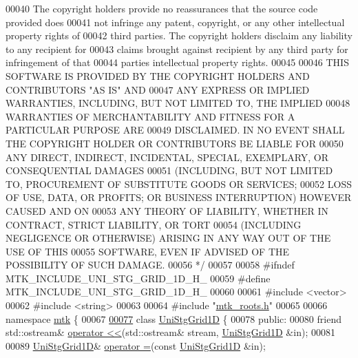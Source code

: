 \begin{DoxyCode}
00040 \textcolor{comment}{The copyright holders provide no reassurances that the source code provided does}
00041 \textcolor{comment}{not infringe any patent, copyright, or any other intellectual property rights of}
00042 \textcolor{comment}{third parties. The copyright holders disclaim any liability to any recipient for}
00043 \textcolor{comment}{claims brought against recipient by any third party for infringement of that}
00044 \textcolor{comment}{parties intellectual property rights.}
00045 \textcolor{comment}{}
00046 \textcolor{comment}{THIS SOFTWARE IS PROVIDED BY THE COPYRIGHT HOLDERS AND CONTRIBUTORS "AS IS" AND}
00047 \textcolor{comment}{ANY EXPRESS OR IMPLIED WARRANTIES, INCLUDING, BUT NOT LIMITED TO, THE IMPLIED}
00048 \textcolor{comment}{WARRANTIES OF MERCHANTABILITY AND FITNESS FOR A PARTICULAR PURPOSE ARE}
00049 \textcolor{comment}{DISCLAIMED. IN NO EVENT SHALL THE COPYRIGHT HOLDER OR CONTRIBUTORS BE LIABLE FOR}
00050 \textcolor{comment}{ANY DIRECT, INDIRECT, INCIDENTAL, SPECIAL, EXEMPLARY, OR CONSEQUENTIAL DAMAGES}
00051 \textcolor{comment}{(INCLUDING, BUT NOT LIMITED TO, PROCUREMENT OF SUBSTITUTE GOODS OR SERVICES;}
00052 \textcolor{comment}{LOSS OF USE, DATA, OR PROFITS; OR BUSINESS INTERRUPTION) HOWEVER CAUSED AND ON}
00053 \textcolor{comment}{ANY THEORY OF LIABILITY, WHETHER IN CONTRACT, STRICT LIABILITY, OR TORT}
00054 \textcolor{comment}{(INCLUDING NEGLIGENCE OR OTHERWISE) ARISING IN ANY WAY OUT OF THE USE OF THIS}
00055 \textcolor{comment}{SOFTWARE, EVEN IF ADVISED OF THE POSSIBILITY OF SUCH DAMAGE.}
00056 \textcolor{comment}{*/}
00057 
00058 \textcolor{preprocessor}{#ifndef MTK\_INCLUDE\_UNI\_STG\_GRID\_1D\_H\_}
00059 \textcolor{preprocessor}{#define MTK\_INCLUDE\_UNI\_STG\_GRID\_1D\_H\_}
00060 
00061 \textcolor{preprocessor}{#include <vector>}
00062 \textcolor{preprocessor}{#include <string>}
00063 
00064 \textcolor{preprocessor}{#include "\hyperlink{mtk__roots_8h}{mtk\_roots.h}"}
00065 
00066 \textcolor{keyword}{namespace }\hyperlink{namespacemtk}{mtk} \{
00067 
\hypertarget{mtk__uni__stg__grid__1d_8h_source_l00077}{}\hyperlink{classmtk_1_1UniStgGrid1D}{00077} \textcolor{keyword}{class }\hyperlink{classmtk_1_1UniStgGrid1D}{UniStgGrid1D} \{
00078  \textcolor{keyword}{public}:
00080   \textcolor{keyword}{friend} std::ostream& \hyperlink{classmtk_1_1UniStgGrid1D_af968dff5cf550099c6917b8c1ea18e09}{operator <<}(std::ostream& stream, \hyperlink{classmtk_1_1UniStgGrid1D}{UniStgGrid1D} &in);
00081 
00089   \hyperlink{classmtk_1_1UniStgGrid1D}{UniStgGrid1D}& \hyperlink{classmtk_1_1UniStgGrid1D_aca4208d5e49e2c5c7c88e8919772fb2a}{operator =}(\textcolor{keyword}{const} \hyperlink{classmtk_1_1UniStgGrid1D}{UniStgGrid1D} &in);

\end{DoxyCode}
